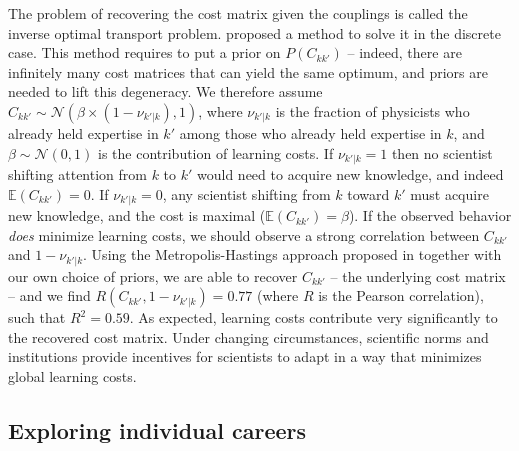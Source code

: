 \documentclass{article}
\begin{document}
The problem of recovering the cost matrix given the couplings is called the inverse optimal transport problem. \citet{Chu2021} proposed a method to solve it in the discrete case. This method requires to put a prior on $P(C_{kk'})$ -- indeed, there are infinitely many cost matrices that can yield the same optimum, and priors are needed to lift this degeneracy. We therefore assume $C_{kk'}\sim \mathcal{N}(\beta \times (1-\nu_{k'|k}),1)$, where $\nu_{k'|k}$ is the fraction of physicists who already held expertise in $k'$ among those who already held expertise in $k$, and $\beta\sim\mathcal{N}(0,1)$ is the contribution of learning costs. If $\nu_{k'|k}=1$ then no scientist shifting attention from $k$ to $k'$ would need to acquire new knowledge, and indeed $\mathbb{E}(C_{kk'})=0$. If $\nu_{k'|k}=0$, any scientist shifting from $k$ toward $k'$ must acquire new knowledge, and the cost is maximal ($\mathbb{E}(C_{kk'})=\beta$). If the observed behavior \textit{does} minimize learning costs, we should observe a strong correlation between $C_{kk'}$ and $1-\nu_{k'|k}$.  Using the Metropolis-Hastings approach proposed in \citealt{Chu2021} together with our own choice of priors, we are able to recover $C_{kk'}$ -- the underlying cost matrix -- and we find $R(C_{kk'},1-\nu_{k'|k})=0.77$ (where $R$ is the Pearson correlation), such that $R^2=0.59$. As expected, learning costs contribute very significantly to the recovered cost matrix. Under changing circumstances, scientific norms and institutions provide incentives for scientists to adapt in a way that minimizes global learning costs.

\subsection{\label{sec:cases}Exploring individual careers}
\end{document}
